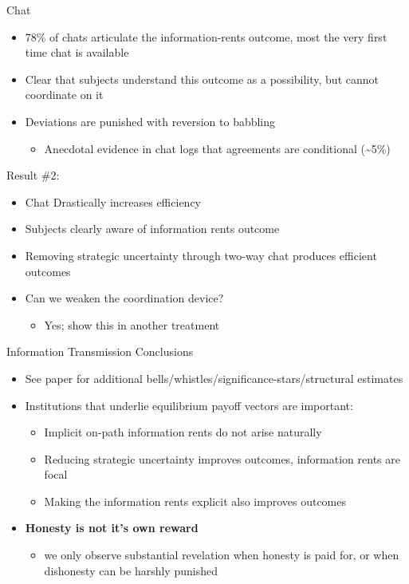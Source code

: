 \documentclass{beamer}
\begin{document}
\begin{frame}{Chat}
\begin{itemize}
\item 78\% of chats articulate the information-rents outcome, most the very
first time chat is available
\item Clear that subjects understand this outcome as a possibility, but
cannot coordinate on it
\item Deviations are punished with reversion to babbling
\begin{itemize}
\item Anecdotal evidence in chat logs that agreements are conditional (\textasciitilde 5\%)
\end{itemize}
\end{itemize}
\end{frame}

\begin{frame}
{\Large Result \#2:}
\begin{itemize}
	\item Chat Drastically increases efficiency
	\item Subjects clearly aware of information rents outcome
	\item Removing strategic uncertainty through two-way chat produces efficient outcomes
\pause
	\item Can we weaken the coordination device?
		\begin{itemize}
			\item Yes; show this in another treatment
		\end{itemize}
\end{itemize}
\end{frame}

\begin{frame}{Information Transmission Conclusions}
\begin{itemize}
\item See paper for additional bells/whistles/significance-stars/structural
estimates
\item Institutions that underlie equilibrium payoff vectors are important:

\begin{itemize}
\item Implicit on-path information rents do not arise naturally
\item Reducing strategic uncertainty improves outcomes, information rents
are focal
\item Making the information rents explicit also improves outcomes
\end{itemize}
\item \textbf{Honesty is not it's own reward}
\begin{itemize}
\item we only observe substantial revelation when honesty is paid for, or
when dishonesty can be harshly punished
\end{itemize}
\end{itemize}
\end{frame}
\end{document}

